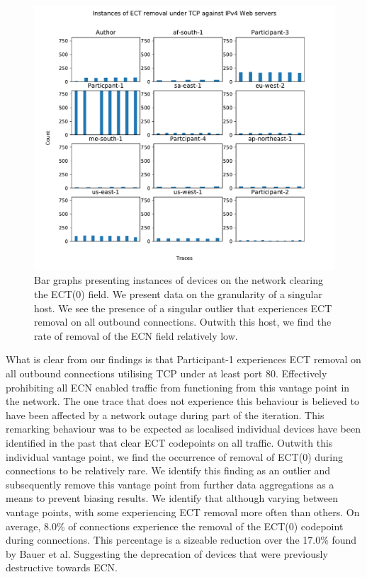 \documentclass{l4proj}
\begin{document}
\begin{figure}[H]
    \centering
    \includegraphics[scale=0.7]{dissertation/images/tcp_bar.pdf}
    \caption{Bar graphs presenting instances of devices on the network clearing the ECT(0) field. We present data on the granularity of a singular host. We see the presence of a singular outlier that experiences ECT removal on all outbound connections. Outwith this host, we find the rate of removal of the ECN field relatively low.}
    \label{fig:ect_strip}
\end{figure}

What is clear from our findings is that Participant-1 experiences ECT removal on all outbound connections utilising TCP under at least port 80. Effectively prohibiting all ECN enabled traffic from functioning from this vantage point in the network. The one trace that does not experience this behaviour is believed to have been affected by a network outage during part of the iteration. This remarking behaviour was to be expected as localised individual devices have been identified in the past that clear ECT codepoints on all traffic\cite{bauer_measuring_2011}. Outwith this individual vantage point, we find the occurrence of removal of ECT(0) during connections to be relatively rare. We identify this finding as an outlier and subsequently remove this vantage point from further data aggregations as a means to prevent biasing results. We identify that although varying between vantage points, with some experiencing ECT removal more often than others. On average, 8.0\% of connections experience the removal of the ECT(0) codepoint during connections. This percentage is a sizeable reduction over the 17.0\% found by Bauer et al\cite{bauer_measuring_2011}. Suggesting the deprecation of devices that were previously destructive towards ECN.
\end{document}

